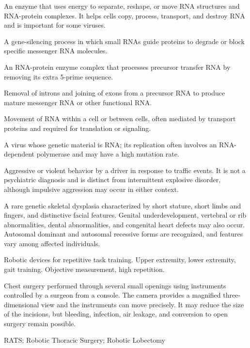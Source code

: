  An enzyme that uses energy to separate, reshape, or move RNA structures and RNA-protein complexes. It helps cells copy, process, transport, and destroy RNA and is important for some viruses.

 A gene-silencing process in which small RNAs guide proteins to degrade or block specific messenger RNA molecules.

 An RNA-protein enzyme complex that processes precursor transfer RNA by removing its extra 5-prime sequence.

 Removal of introns and joining of exons from a precursor RNA to produce mature messenger RNA or other functional RNA.

 Movement of RNA within a cell or between cells, often mediated by transport proteins and required for translation or signaling.

 A virus whose genetic material is RNA; its replication often involves an RNA-dependent polymerase and may have a high mutation rate.

 Aggressive or violent behavior by a driver in response to traffic events. It is not a psychiatric diagnosis and is distinct from intermittent explosive disorder, although impulsive aggression may occur in either context.

 A rare genetic skeletal dysplasia characterized by short
stature, short limbs and fingers, and distinctive facial features. Genital underdevelopment,
vertebral or rib abnormalities, dental abnormalities, and congenital heart defects may
also occur. Autosomal dominant and autosomal recessive forms are recognized, and
features vary among affected individuals.

 Robotic devices for repetitive task training. Upper extremity, lower extremity, gait
training. Objective measurement, high repetition.

 Chest surgery performed through several small openings using instruments controlled by a surgeon from a console. The camera provides a magnified three-dimensional view and the instruments can move precisely. It may reduce the size of the incisions, but bleeding, infection, air leakage, and conversion to open surgery remain possible.

\synonyms
RATS; Robotic Thoracic Surgery; Robotic Lobectomy

